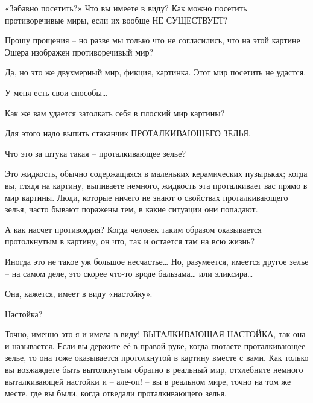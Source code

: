 \documentclass[../main.tex]{subfiles}
\begin{document}
\begin{Dialogue}
\begin{sublevel}
 «Забавно посетить?» Что вы имеете в виду? Как можно посетить противоречивые миры, если их вообще НЕ СУЩЕСТВУЕТ?

 Прошу прощения \--- но разве мы только что не согласились, что на этой картине Эшера изображен противоречивый мир?

 Да, но это же двухмерный мир, фикция, картинка. Этот мир посетить не удастся.

 У меня есть свои способы\ldots{}

 Как же вам удается затолкать себя в плоский мир картины?

 Для этого надо выпить стаканчик {\lsstyle ПРОТАЛКИВАЮЩЕГО} ЗЕЛЬЯ\@.

 Что это за штука такая \--- проталкивающее зелье?

 Это жидкость, обычно содержащаяся в маленьких керамических пузырьках; когда вы, глядя на картину, выпиваете немного, жидкость эта проталкивает вас прямо в мир картины. Люди, которые ничего не знают о свойствах проталкивающего зелья, часто бывают поражены тем, в какие ситуации они попадают.

 А как насчет противоядия? Когда человек таким образом оказывается протолкнутым в картину, он что, так и остается там на всю жизнь?

 Иногда это не такое уж большое несчастье\ldots{} Но, разумеется, имеется другое зелье \--- на самом деле, это скорее что-то вроде бальзама\ldots{} или эликсира\ldots{}


\begin{customlevel}{0}
     Она, кажется, имеет в виду «настойку».
\end{customlevel}


 Настойка?

 Точно, именно это я и имела в виду! {\lsstyle ВЫТАЛКИВАЮЩАЯ} НАСТОЙКА, так она и называется. Если вы держите её в правой руке, когда глотаете проталкивающее зелье, то она тоже оказывается протолкнутой в картину вместе с вами. Как только вы возжаждете быть вытолкнутым обратно в реальный мир, отхлебните немного выталкивающей настойки и \--- але-оп! \--- вы в реальном мире, точно на том же месте, где вы были, когда отведали проталкивающего зелья.


\end{sublevel}
\end{Dialogue}
\end{document}

